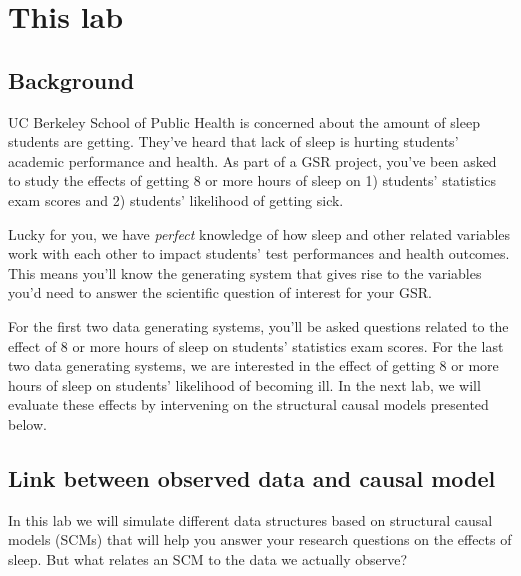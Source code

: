 \documentclass{exam}
\begin{document}
\section{This lab}

\subsection{Background}

UC Berkeley School of Public Health is concerned about the amount of sleep students are getting. They've heard that lack of sleep is hurting students' academic performance and health. As part of a GSR project, you've been asked to study the effects of getting 8 or more hours of sleep on 1) students' statistics exam scores and 2) students' likelihood of getting sick. 

\noindent Lucky for you, we have \textit{perfect} knowledge of how sleep and other related variables work with each other to  impact students' test performances and health outcomes. This means you'll know the generating system that gives rise to the variables you'd need to answer the scientific question of interest for your GSR.

\noindent For the first two data generating systems, you'll be asked questions related to the effect of 8 or more hours of sleep on students' statistics exam scores. For the last two data generating systems, we are interested in the effect of getting 8 or more hours of sleep on students' likelihood of becoming ill. In the next lab, we will evaluate these effects by intervening on the structural causal models presented below.

\subsection{Link between observed data and causal model}

In this lab we will simulate different data structures based on structural causal models (SCMs) that will help you answer your research questions on the effects of sleep. But what relates an SCM to the data we actually observe? 
\end{document}
